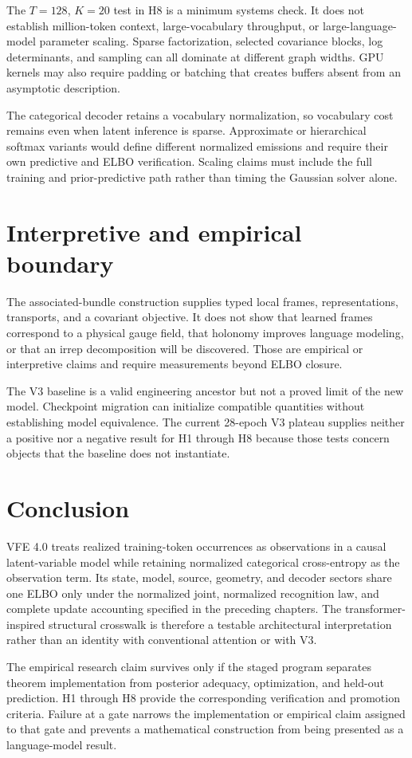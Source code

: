 The $T=128$, $K=20$ test in H8 is a minimum systems check. It does not establish million-token context, large-vocabulary throughput, or large-language-model parameter scaling. Sparse factorization, selected covariance blocks, log determinants, and sampling can all dominate at different graph widths. GPU kernels may also require padding or batching that creates buffers absent from an asymptotic description.

The categorical decoder retains a vocabulary normalization, so vocabulary cost remains even when latent inference is sparse. Approximate or hierarchical softmax variants would define different normalized emissions and require their own predictive and ELBO verification. Scaling claims must include the full training and prior-predictive path rather than timing the Gaussian solver alone.

\section{Interpretive and empirical boundary}

The associated-bundle construction supplies typed local frames, representations, transports, and a covariant objective. It does not show that learned frames correspond to a physical gauge field, that holonomy improves language modeling, or that an irrep decomposition will be discovered. Those are empirical or interpretive claims and require measurements beyond ELBO closure.

The V3 baseline is a valid engineering ancestor but not a proved limit of the new model. Checkpoint migration can initialize compatible quantities without establishing model equivalence. The current 28-epoch V3 plateau supplies neither a positive nor a negative result for H1 through H8 because those tests concern objects that the baseline does not instantiate.

\section{Conclusion}

VFE 4.0 treats realized training-token occurrences as observations in a causal latent-variable model while retaining normalized categorical cross-entropy as the observation term. Its state, model, source, geometry, and decoder sectors share one ELBO only under the normalized joint, normalized recognition law, and complete update accounting specified in the preceding chapters. The transformer-inspired structural crosswalk is therefore a testable architectural interpretation rather than an identity with conventional attention or with V3.

The empirical research claim survives only if the staged program separates theorem implementation from posterior adequacy, optimization, and held-out prediction. H1 through H8 provide the corresponding verification and promotion criteria. Failure at a gate narrows the implementation or empirical claim assigned to that gate and prevents a mathematical construction from being presented as a language-model result.
